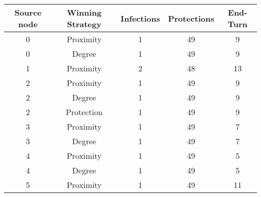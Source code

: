 \documentclass[results.tex]{subfiles}
\begin{document}
    \begin{center}
        \begin{tabular}{| c || c | c | c | c |}
            \hline
            {\bfseries Source node} & {\bfseries Winning Strategy} & {\bfseries Infections} & {\bfseries Protections}
            & {\bfseries End-Turn}
            \\  %
            \hline\hline
            0                       & Proximity                    & 1                      & 49                      & 9                    \\
            \hline
            0                       & Degree                       & 1                      & 49                      & 9                    \\
            \hline
            1                       & Proximity                    & 2                      & 48                      & 13                   \\
            \hline
            2                       & Proximity                    & 1                      & 49                      & 9                    \\
            \hline
            2                       & Degree                       & 1                      & 49                      & 9                    \\
            \hline
            2                       & Protection                   & 1                      & 49                      & 9                    \\
            \hline
            3                       & Proximity                    & 1                      & 49                      & 7                    \\
            \hline
            3                       & Degree                       & 1                      & 49                      & 7                    \\
            \hline
            4                       & Proximity                    & 1                      & 49                      & 5                    \\
            \hline
            4                       & Degree                       & 1                      & 49                      & 5                    \\
            \hline
            5                       & Proximity                    & 1                      & 49                      & 11                   \\

\end{tabular}
\end{center}
\end{document}
